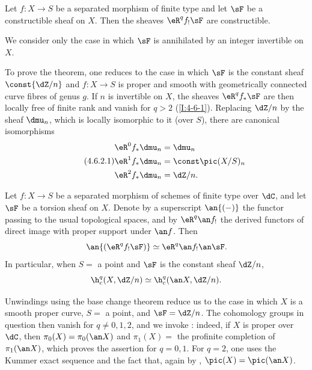 \documentclass[oneside]{book}
\begin{document}
\begin{theorem}\label{I:4-6-2}
Let $f:X\to S$ be a separated morphism of finite type and let $\sF$ be
a constructible sheaf on $X$. Then the sheaves $\eR^qf_!\sF$ are
constructible.
\end{theorem}

We consider only the case in which $\sF$ is annihilated by an integer
invertible on $X$.

To prove the theorem, one reduces to the case in which $\sF$ is the
constant sheaf $\const{\dZ/n}$ and $f:X\to S$ is proper and smooth with
geometrically connected curve fibres of genus $g$. If $n$ is invertible
on $X$, the sheaves $\eR^qf_*\sF$ are then locally free of finite rank
and vanish for $q>2$ (\ref{I:4-6-1}). Replacing $\dZ/n$ by the sheaf
$\dmu_n$, which is locally isomorphic to it (over $S$), there are
canonical isomorphisms
\begin{equation*}\tag{4.6.2.1}\label{I:eq:4-6-2-1}
\begin{aligned}
  \eR^0 f_* \dmu_n &= \dmu_n \\
  \eR^1 f_* \dmu_n &= \const\pic(X/S)_n \\
  \eR^2 f_* \dmu_n &= \dZ/n \text{.}
\end{aligned}
\end{equation*}

\begin{theorem}\label{I:4-6-3}
Let $f:X\to S$ be a separated morphism of schemes of finite type over
$\dC$, and let $\sF$ be a torsion sheaf on $X$. Denote by a superscript
$\an{(-)}$ the functor passing to the usual topological spaces, and by
$\eR^q\an f_!$ the derived functors of direct image with proper support
under $\an f$. Then
\[
  \an{(\eR^q f_! \sF)} \simeq \eR^q \an f_! \an \sF \text{.}
\]
In particular, when $S=$ a point and $\sF$ is the constant sheaf
$\dZ/n$,
\[
  \h_c^q(X,\dZ/n) \simeq \h_c^q(\an X,\dZ/n)\text{.}
\]
\end{theorem}

Unwindings using the base change theorem reduce us to the case in which
$X$ is a smooth proper curve, $S=$ a point, and $\sF=\dZ/n$. The
cohomology groups in question then vanish for $q\ne0,1,2$, and we invoke
\cite{se55}: indeed, if $X$ is proper over $\dC$, then
$\pi_0(X)=\pi_0(\an X)$ and $\pi_1(X)=$ the profinite completion of
$\pi_1(\an X)$, which proves the assertion for $q=0,1$. For $q=2$,
one uses the Kummer exact sequence and the fact that, again by
\cite{se55}, $\pic(X)=\pic(\an X)$.
\end{document}
